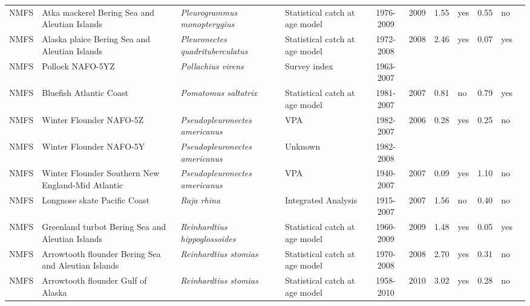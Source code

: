 \begin{longtable}{p{1.8cm}p{3.5cm}p{3.5cm}p{3cm}cccp{0.9cm}cp{0.9cm}c}
  NMFS & Atka mackerel Bering Sea and Aleutian Islands & \textit{Pleurogrammus monopterygius} & Statistical catch at age model & 1976-2009 & 2009 & 1.55 & yes & 0.55 & no & \cite{2008_SAFE_BSAIatka.pdf} \\ 
  NMFS & Alaska plaice Bering Sea and Aleutian Islands & \textit{Pleuronectes quadrituberculatus} & Statistical catch at age model & 1972-2008 & 2008 & 2.46 & yes & 0.07 & yes & \cite{AFSC-ALPLAICBSAI-2008-Alaska plaice BSAI.pdf} \\ 
  NMFS & Pollock NAFO-5YZ & \textit{Pollachius virens} & Survey index & 1963-2007 &  &  &  &  &  & \cite{http://www.nefsc.noaa.gov/nefsc/publications/crd/crd0815/crd0815.pdf} \\ 
  NMFS & Bluefish Atlantic Coast & \textit{Pomatomus saltatrix} & Statistical catch at age model & 1981-2007 & 2007 & 0.81 & no & 0.79 & yes & \cite{final-2005-SAW-41-assessment.pdf} \\ 
  NMFS & Winter Flounder NAFO-5Z & \textit{Pseudopleuronectes americanus} & VPA & 1982-2007 & 2006 & 0.28 & yes & 0.25 & no & \cite{garm3k.pdf} \\ 
  NMFS & Winter Flounder NAFO-5Y & \textit{Pseudopleuronectes americanus} & Unknown & 1982-2008 &  &  &  &  &  & \cite{http://www.nefsc.noaa.gov/nefsc/publications/crd/crd0815/crd0815.pdf} \\ 
  NMFS & Winter Flounder Southern New England-Mid Atlantic & \textit{Pseudopleuronectes americanus} & VPA & 1940-2007 & 2007 & 0.09 & yes & 1.10 & no & \cite{NMFS-SNEMATL-Pseudopleuronectesamercianus-2008.pdf} \\ 
  NMFS & Longnose skate Pacific Coast & \textit{Raja rhina} & Integrated Analysis & 1915-2007 & 2007 & 1.56 & no & 0.40 & no & \cite{NWFSC-LNOSESKAPCOAST-2008-Longnose skate.pdf} \\ 
  NMFS & Greenland turbot Bering Sea and Aleutian Islands & \textit{Reinhardtius hippoglossoides} & Statistical catch at age model & 1960-2009 & 2009 & 1.48 & yes & 0.05 & yes & \cite{2008_SAFE_BSAIturbot.pdf} \\ 
  NMFS & Arrowtooth flounder Bering Sea and Aleutian Islands & \textit{Reinhardtius stomias} & Statistical catch at age model & 1970-2008 & 2008 & 2.70 & yes & 0.31 & no & \cite{AFSC-ARFLOUNDBSAI-2007-Arrowtooth flounder BSAI.pdf} \\ 
  NMFS & Arrowtooth flounder Gulf of Alaska & \textit{Reinhardtius stomias} & Statistical catch at age model & 1958-2010 & 2010 & 3.02 & yes & 0.28 & no & \cite{2008_SAFE_GOAatf.pdf} \\ 

\end{longtable}
